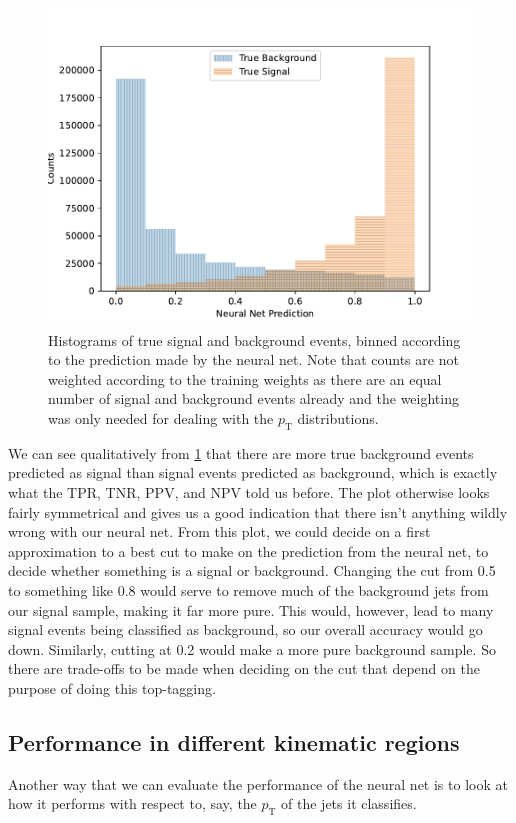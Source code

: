 \documentclass[11pt]{article}
\numberwithin{equation}{section}
\numberwithin{figure}{section}
\numberwithin{table}{section}
\begin{document}
\begin{figure}[h]
    \begin{center}
        \includegraphics[width=.8\textwidth]{Plots/bkg_vs_signal.pdf}
        \caption{Histograms of true signal and background events, binned according to the prediction made by the neural net. Note that counts are not weighted according to the training weights as there are an equal number of signal and background events already and the weighting was only needed for dealing with the $p_\mathrm{T}$ distributions.}
        \label{fig:bkg_vs_signal}
    \end{center}
\end{figure}

We can see qualitatively from \cref{fig:bkg_vs_signal} that there are more true background events predicted as signal than signal events predicted as background, which is exactly what the TPR, TNR, PPV, and NPV told us before. The plot otherwise looks fairly symmetrical and gives us a good indication that there isn't anything wildly wrong with our neural net. From this plot, we could decide on a first approximation to a best cut to make on the prediction from the neural net, to decide whether something is a signal or background. Changing the cut from 0.5 to something like 0.8 would serve to remove much of the background jets from our signal sample, making it far more pure. This would, however, lead to many signal events being classified as background, so our overall accuracy would go down. Similarly, cutting at 0.2 would make a more pure background sample. So there are trade-offs to be made when deciding on the cut that depend on the purpose of doing this top-tagging. 

\subsection{Performance in different kinematic regions}\label{sec:Kinematic_Performance}
Another way that we can evaluate the performance of the neural net is to look at how it performs with respect to, say, the $p_\mathrm{T}$ of the jets it classifies. 
\end{document}
